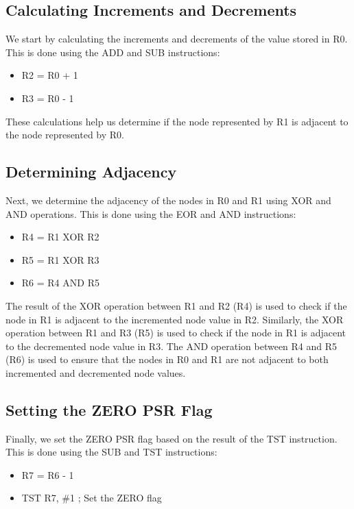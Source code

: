 \subsection{Calculating Increments and Decrements}
We start by calculating the increments and decrements of the value stored in R0. This is done using the ADD and SUB instructions:

\begin{itemize}
    \item R2 = R0 + 1
    \item R3 = R0 - 1
\end{itemize}

These calculations help us determine if the node represented by R1 is adjacent to the node represented by R0.

\subsection{Determining Adjacency}
Next, we determine the adjacency of the nodes in R0 and R1 using XOR and AND operations. This is done using the EOR and AND instructions:

\begin{itemize}
    \item R4 = R1 XOR R2
    \item R5 = R1 XOR R3
    \item R6 = R4 AND R5
\end{itemize}

The result of the XOR operation between R1 and R2 (R4) is used to check if the node in R1 is adjacent to the incremented node value in R2. Similarly, the XOR operation between R1 and R3 (R5) is used to check if the node in R1 is adjacent to the decremented node value in R3. The AND operation between R4 and R5 (R6) is used to ensure that the nodes in R0 and R1 are not adjacent to both incremented and decremented node values.

\subsection{Setting the ZERO PSR Flag}
Finally, we set the ZERO PSR flag based on the result of the TST instruction. This is done using the SUB and TST instructions:

\begin{itemize}
    \item R7 = R6 - 1
    \item TST R7, \#1 ; Set the ZERO flag
\end{itemize}

